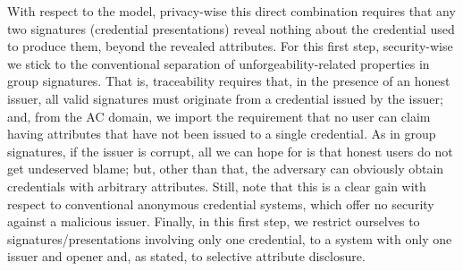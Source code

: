 With respect to the model, privacy-wise this direct combination requires that
any two signatures (credential presentations) reveal nothing about the
credential used to produce them, beyond the revealed attributes. For this first
step, security-wise we stick to the conventional separation of
unforgeability-related properties in group signatures. That is, traceability
requires that, in the presence of an honest issuer, all valid signatures must
originate from a credential issued by the issuer; and, from the AC domain, we
import the requirement that no user can claim having attributes that have not
been issued to a single credential. As in group signatures, if the issuer is
corrupt, all we can hope for is that honest users do not get undeserved blame;
but, other than that, the adversary can obviously obtain credentials with
arbitrary attributes. Still, note that this is a clear gain with respect to
conventional anonymous credential systems, which offer no security against a
malicious issuer.
%
Finally, in this first step, we restrict ourselves to signatures/presentations
involving only one credential, to a system with only one issuer and opener  and,
as stated, to selective attribute disclosure.







